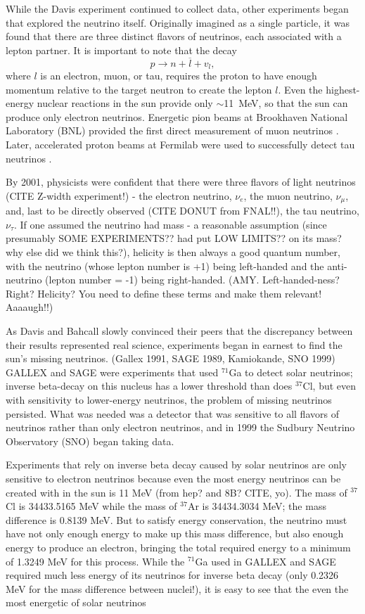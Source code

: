While the Davis experiment continued to collect data, other experiments began that explored the neutrino itself.  Originally imagined as a single particle, it was found that there are three distinct flavors of neutrinos, each associated with a lepton partner.  It is important to note that the decay 
\begin{equation}
p \rightarrow n + \overbar{l} + v_l,
\end{equation}
where $l$ is an electron, muon, or tau, requires the proton to have enough momentum relative to the target neutron to create the lepton $l$.  Even the highest-energy nuclear reactions in the sun provide only $\sim$11~MeV, so that the sun can produce only electron neutrinos.  Energetic pion beams at Brookhaven National Laboratory (BNL) provided the first direct measurement of muon neutrinos \cite{muonNeutrino}.  Later, accelerated proton beams at Fermilab were used to successfully detect tau neutrinos \cite{tauNeutrino}.

By 2001, physicists were confident that there were three flavors of light neutrinos (CITE Z-width experiment!) - the electron neutrino, $\nu_e$, the muon neutrino, $\nu_{\mu}$, and, last to be directly observed (CITE DONUT from FNAL!!), the tau neutrino, $\nu_{\tau}$.  If one assumed the neutrino had mass - a reasonable assumption (since presumably SOME EXPERIMENTS?? had put LOW LIMITS?? on its mass?  why else did we think this?), helicity is then always a good quantum number, with the neutrino (whose lepton number is +1) being left-handed and the anti-neutrino (lepton number = -1) being right-handed.  (AMY.  Left-handed-ness?  Right?  Helicity?  You need to define these terms and make them relevant!  Aaaaugh!!)

As Davis and Bahcall slowly convinced their peers that the discrepancy between their results represented real science, experiments began in earnest to find the sun's missing neutrinos.  (Gallex 1991, SAGE 1989, Kamiokande, SNO 1999)  GALLEX and SAGE were experiments that used $^{71}$Ga to detect solar neutrinos; inverse beta-decay on this nucleus has a lower threshold than does $^{37}$Cl, but even with sensitivity to lower-energy neutrinos, the problem of missing neutrinos persisted.  What was needed was a detector that was sensitive to all flavors of neutrinos rather than only electron neutrinos, and in 1999 the Sudbury Neutrino Observatory (SNO) began taking data.

Experiments that rely on inverse beta decay caused by solar neutrinos are only sensitive to electron neutrinos because even the most energy neutrinos can be created with in the sun is 11 MeV (from hep? and 8B? CITE, yo).  The mass of $^{37}$Cl is 34433.5165 MeV while the mass of $^{37}$Ar is 34434.3034 MeV; the mass difference is 0.8139 MeV.  But to satisfy energy conservation, the neutrino must have not only enough energy to make up this mass difference, but also enough energy to produce an electron, bringing the total required energy to a minimum of 1.3249 MeV for this process.  While the $^{71}$Ga used in GALLEX and SAGE required much less energy of its neutrinos for inverse beta decay (only 0.2326 MeV for the mass difference between nuclei!), it is easy to see that the even the most energetic of solar neutrinos  

